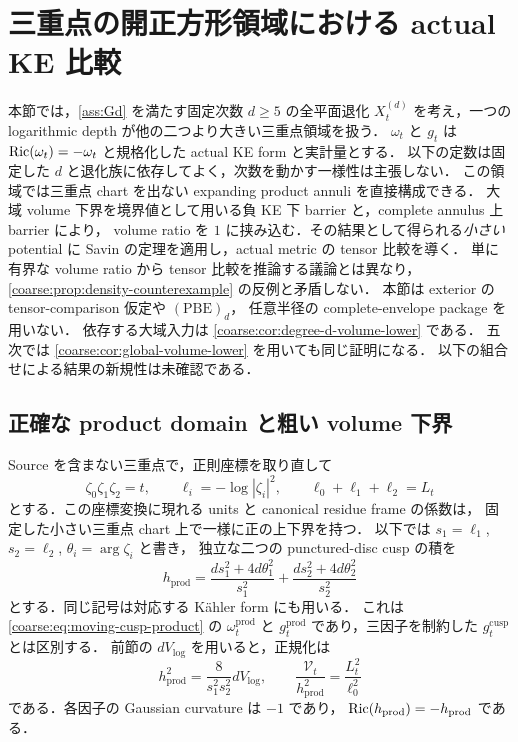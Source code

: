 \section{三重点の開正方形領域における actual KE 比較}
\label{sec:moving-triple-comparison}

本節では，\cref{ass:Gd} を満たす固定次数 $d\ge5$ の全平面退化
$X_t^{(d)}$ を考え，一つの logarithmic depth が他の二つより大きい三重点領域を扱う．
$\omega_t$ と $g_t$ は $\operatorname{Ric}(\omega_t)=-\omega_t$ と規格化した actual KE form と実計量とする．
以下の定数は固定した $d$ と退化族に依存してよく，次数を動かす一様性は主張しない．
この領域では三重点 chart を出ない expanding product annuli を直接構成できる．
大域 volume 下界を境界値として用いる負 KE 下 barrier と，complete annulus 上 barrier により，
volume ratio を $1$ に挟み込む．その結果として得られる\emph{小さい} potential に
Savin の定理を適用し，actual metric の tensor 比較を導く．
単に有界な volume ratio から tensor 比較を推論する議論とは異なり，
\cref{coarse:prop:density-counterexample} の反例と矛盾しない．
本節は exterior の tensor-comparison 仮定や $\mathrm{(PBE)}_d$，
任意半径の complete-envelope package を用いない．
依存する大域入力は \cref{coarse:cor:degree-d-volume-lower} である．
五次では \cref{coarse:cor:global-volume-lower} を用いても同じ証明になる．
以下の組合せによる結果の新規性は未確認である．

\subsection{正確な product domain と粗い volume 下界}

Source を含まない三重点で，正則座標を取り直して
\begin{equation}\label{moving:eq:exact-triple}
 \zeta_0\zeta_1\zeta_2=t,\qquad
 \ell_i=-\log|\zeta_i|^2,\qquad
 \ell_0+\ell_1+\ell_2=L_t
\end{equation}
とする．この座標変換に現れる units と canonical residue frame の係数は，
固定した小さい三重点 chart 上で一様に正の上下界を持つ．
以下では $s_1=\ell_1$, $s_2=\ell_2$, $\theta_i=\arg \zeta_i$ と書き，
独立な二つの punctured-disc cusp の積を
\begin{equation}\label{moving:eq:product-cusp}
 h_{\mathrm{prod}}
 =\frac{ds_1^2+4d\theta_1^2}{s_1^2}
  +\frac{ds_2^2+4d\theta_2^2}{s_2^2}
\end{equation}
とする．同じ記号は対応する K\"ahler form にも用いる．
これは \eqref{coarse:eq:moving-cusp-product} の $\omega_t^{\mathrm{prod}}$ と
$g_t^{\mathrm{prod}}$ であり，三因子を制約した $g_t^{\mathrm{cusp}}$ とは区別する．
前節の $dV_{\log}$ を用いると，正規化は
\[
 h_{\mathrm{prod}}^2=\frac{8}{s_1^2s_2^2}dV_{\log},
 \qquad
 \frac{\mathcal V_t}{h_{\mathrm{prod}}^2}=\frac{L_t^2}{\ell_0^2}
\]
である．各因子の Gaussian curvature は $-1$ であり，
$\operatorname{Ric}(h_{\mathrm{prod}})=-h_{\mathrm{prod}}$ である．

